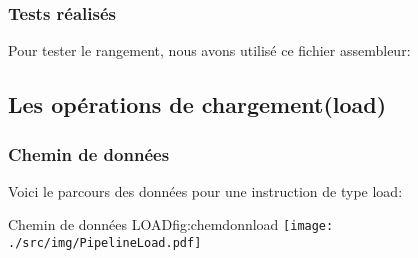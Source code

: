 \subsubsection{Tests réalisés}
Pour tester le rangement, nous avons utilisé ce fichier assembleur:



\subsection{Les opérations de chargement(load)}
\subsubsection{Chemin de données}
Voici le parcours des données pour une instruction de type load:
\begin{figureGraphics}{Chemin de données LOAD}{fig:chemdonnload}
  \centering
  \texttt{[image: ./src/img/PipelineLoad.pdf]}
\end{figureGraphics}
